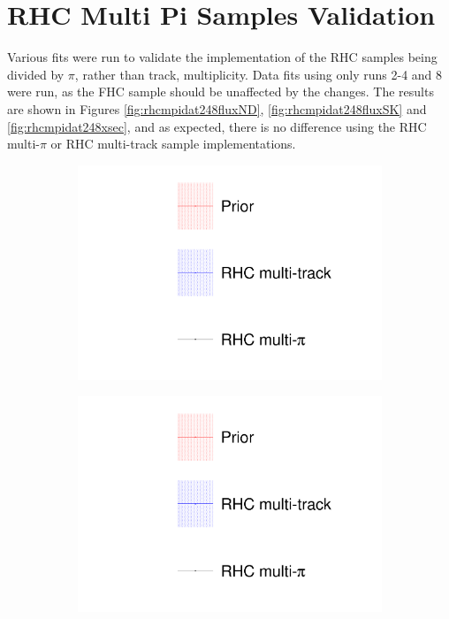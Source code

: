 \chapter{RHC Multi Pi Samples Validation}\label{appendix:rhcmpi}

Various fits were run to validate the implementation of the RHC samples being divided by $\pi$, rather than track, multiplicity. Data fits using only runs 2-4 and 8 were run, as the FHC sample should be unaffected by the changes. The results are shown in Figures \ref{fig:rhcmpidat248fluxND}, \ref{fig:rhcmpidat248fluxSK} and \ref{fig:rhcmpidat248xsec}, and as expected, there is no difference using the RHC multi-$\pi$ or RHC multi-track sample implementations. 

\begin{figure}[t]
\centering
\begin{subfigure}{0.3\textwidth}
  \centering
  \includegraphics[width=1.0\linewidth, trim={5mm  130mm 0mm 10mm}, clip]{figs/rhcmpdat248_leg}	
\end{subfigure}
\begin{subfigure}{0.3\textwidth}
  \centering
  \includegraphics[width=1.0\linewidth, trim={5mm  0mm 0mm 70mm}, clip]{figs/rhcmpdat248_leg}	

\end{subfigure}
\end{figure}
